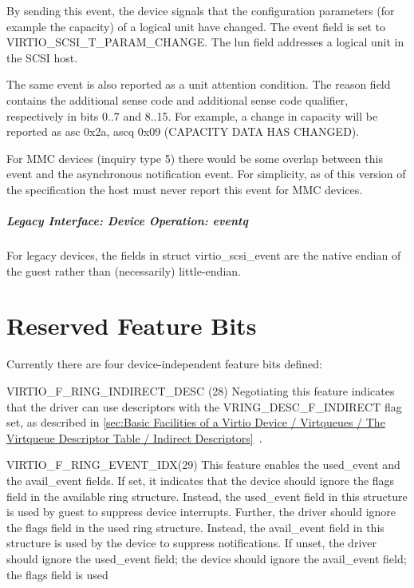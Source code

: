   By sending this event, the device signals that the configuration parameters
  (for example the capacity) of a logical unit have changed.
  The event field is set to VIRTIO_SCSI_T_PARAM_CHANGE.
  The lun field addresses a logical unit in the SCSI host.

  The same event is also reported as a unit attention condition.
  The reason field contains the additional sense code and additional sense code qualifier,
  respectively in bits 0..7 and 8..15.
  For example, a change in capacity will be reported as asc 0x2a, ascq 0x09
  (CAPACITY DATA HAS CHANGED).

  For MMC devices (inquiry type 5) there would be some overlap between this
  event and the asynchronous notification event.
  For simplicity, as of this version of the specification the host must
  never report this event for MMC devices.

\paragraph{Legacy Interface: Device Operation: eventq}\label{sec:Device Types / SCSI Host Device / Device Operation / Device Operation: eventq / Legacy Interface: Device Operation: eventq}
For legacy devices, the fields in struct virtio_scsi_event are the
native endian of the guest rather than (necessarily) little-endian.

\chapter{Reserved Feature Bits}\label{sec:Reserved Feature Bits}

Currently there are four device-independent feature bits defined:

  VIRTIO_F_RING_INDIRECT_DESC (28) Negotiating this feature indicates
  that the driver can use descriptors with the VRING_DESC_F_INDIRECT
  flag set, as described in \ref{sec:Basic Facilities of a Virtio Device / Virtqueues / The Virtqueue Descriptor Table / Indirect Descriptors}~.

  VIRTIO_F_RING_EVENT_IDX(29) This feature enables the used_event
  and the avail_event fields. If set, it indicates that the
  device should ignore the flags field in the available ring
  structure. Instead, the used_event field in this structure is
  used by guest to suppress device interrupts. Further, the
  driver should ignore the flags field in the used ring
  structure. Instead, the avail_event field in this structure is
  used by the device to suppress notifications. If unset, the
  driver should ignore the used_event field; the device should
  ignore the avail_event field; the flags field is used

